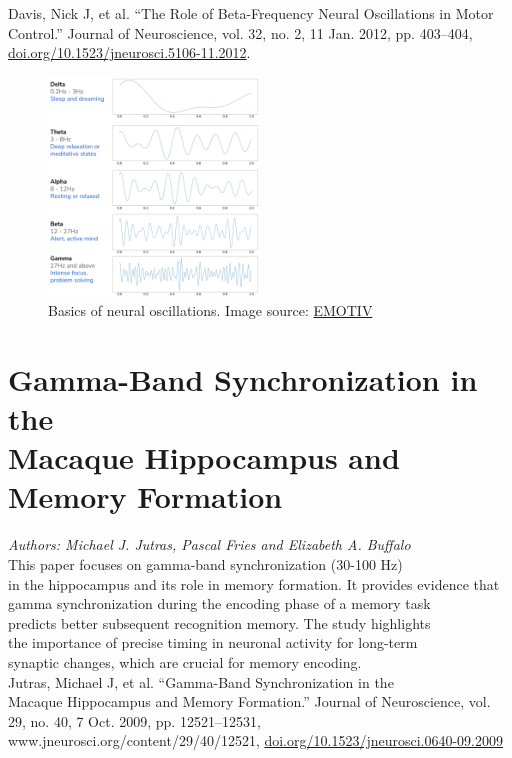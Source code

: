 \documentclass[12pt]{article}
\begin{document}
\noindent Davis, Nick J, et al. “The Role of Beta-Frequency Neural Oscillations in Motor Control.” Journal of Neuroscience, vol. 32, no. 2, 11 Jan. 2012, pp. 403–404, \href{https://doi.org/10.1523/jneurosci.5106-11.2012}{doi.org/10.1523/jneurosci.5106-11.2012}.\\

\begin{figure}[h]
    \centering
    \includegraphics[width=0.5\textwidth]{brain_waves.png} %
    \caption{Basics of neural oscillations. Image source: \href{https://d2z0k1elb7rxgj.cloudfront.net/uploads/2022/09/brain-waves-988x1024.png}{EMOTIV}}
    \label{fig:waves}
\end{figure}

\section{Gamma-Band Synchronization in the\\Macaque Hippocampus and Memory Formation}

\noindent\textit{Authors: Michael J. Jutras, Pascal Fries and Elizabeth A. Buffalo}\\

\noindent This paper focuses on gamma-band synchronization (30-100 Hz)\\in the hippocampus and its role in memory formation. It provides evidence that gamma synchronization during the encoding phase of a memory task\\predicts better subsequent recognition memory. The study highlights\\the importance of precise timing in neuronal activity for long-term\\synaptic changes, which are crucial for memory encoding.\\

\noindent Jutras, Michael J, et al. “Gamma-Band Synchronization in the\\Macaque Hippocampus and Memory Formation.” Journal of Neuroscience, vol. 29, no. 40, 7 Oct. 2009, pp. 12521–12531, www.jneurosci.org/content/29/40/12521, \href{https://doi.org/10.1523/jneurosci.0640-09.2009}{doi.org/10.1523/jneurosci.0640-09.2009}\\
\end{document}
